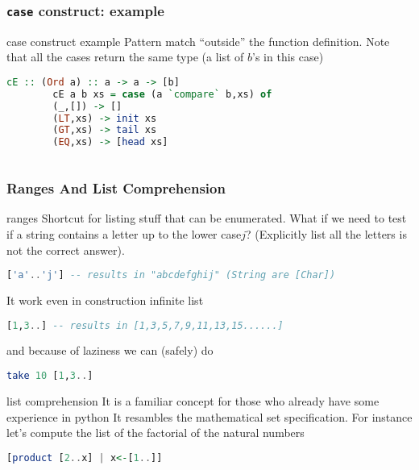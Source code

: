 	\begin{frame}[fragile]\frametitle{\texttt{case} construct: example}
		\begin{exampleblock}{case construct example}
		Pattern match ``outside'' the function definition. Note that all the cases
		return the same type (a list of $b$'s in this case)
		\begin{lstlisting}[language=Haskell,basicstyle=\footnotesize\ttfamily] 
		cE :: (Ord a) :: a -> a -> [b]
		cE a b xs = case (a `compare` b,xs) of
        (_,[]) -> []
        (LT,xs) -> init xs
        (GT,xs) -> tail xs
        (EQ,xs) -> [head xs]
				
			\end{lstlisting}
		\end{exampleblock}
	\end{frame}
	
	\begin{frame}[fragile]\frametitle{Ranges And List Comprehension}
		\begin{exampleblock}{ranges}
		Shortcut for  listing stuff that can be enumerated. What if we need to test if
		a string contains a letter up to the lower case$j$? (Explicitly list all the
		letters is not the correct answer).
		\begin{lstlisting}[language=Haskell,basicstyle=\footnotesize\ttfamily] 
			['a'..'j'] -- results in "abcdefghij" (String are [Char])			
		\end{lstlisting}
		It work even in construction infinite list
		\begin{lstlisting}[language=Haskell,basicstyle=\footnotesize\ttfamily] 
			[1,3..] -- results in [1,3,5,7,9,11,13,15......]			
		\end{lstlisting}
		and because of laziness we can (safely) do
		\begin{lstlisting}[language=Haskell,basicstyle=\footnotesize\ttfamily] 
			take 10 [1,3..] 		
		\end{lstlisting}
		\end{exampleblock}
		\begin{exampleblock}{list comprehension}
		It is a familiar concept for those who already have some experience in python
		It resambles the mathematical set specification. For instance let's compute
		the list of the factorial of the natural numbers 
		 \begin{lstlisting}[language=Haskell,basicstyle=\footnotesize\ttfamily] 
		 [product [2..x] | x<-[1..]] 		
		\end{lstlisting} 
		\end{exampleblock}
		
	\end{frame}
	
	
	